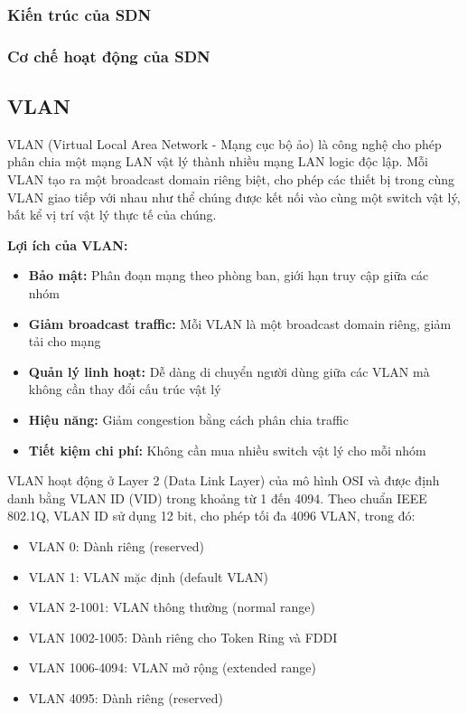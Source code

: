 \subsubsection{Kiến trúc của SDN}
\subsubsection{Cơ chế hoạt động của SDN}

\subsection{VLAN}

VLAN (Virtual Local Area Network - Mạng cục bộ ảo) là công nghệ cho phép phân chia một mạng LAN vật lý thành nhiều mạng LAN logic độc lập. Mỗi VLAN tạo ra một broadcast domain riêng biệt, cho phép các thiết bị trong cùng VLAN giao tiếp với nhau như thể chúng được kết nối vào cùng một switch vật lý, bất kể vị trí vật lý thực tế của chúng.

\textbf{Lợi ích của VLAN:}
\begin{itemize}
    \item \textbf{Bảo mật:} Phân đoạn mạng theo phòng ban, giới hạn truy cập giữa các nhóm
    \item \textbf{Giảm broadcast traffic:} Mỗi VLAN là một broadcast domain riêng, giảm tải cho mạng
    \item \textbf{Quản lý linh hoạt:} Dễ dàng di chuyển người dùng giữa các VLAN mà không cần thay đổi cấu trúc vật lý
    \item \textbf{Hiệu năng:} Giảm congestion bằng cách phân chia traffic
    \item \textbf{Tiết kiệm chi phí:} Không cần mua nhiều switch vật lý cho mỗi nhóm
\end{itemize}

VLAN hoạt động ở Layer 2 (Data Link Layer) của mô hình OSI và được định danh bằng VLAN ID (VID) trong khoảng từ 1 đến 4094. Theo chuẩn IEEE 802.1Q, VLAN ID sử dụng 12 bit, cho phép tối đa 4096 VLAN, trong đó:
\begin{itemize}
    \item VLAN 0: Dành riêng (reserved)
    \item VLAN 1: VLAN mặc định (default VLAN)
    \item VLAN 2-1001: VLAN thông thường (normal range)
    \item VLAN 1002-1005: Dành riêng cho Token Ring và FDDI
    \item VLAN 1006-4094: VLAN mở rộng (extended range)
    \item VLAN 4095: Dành riêng (reserved)
\end{itemize}

